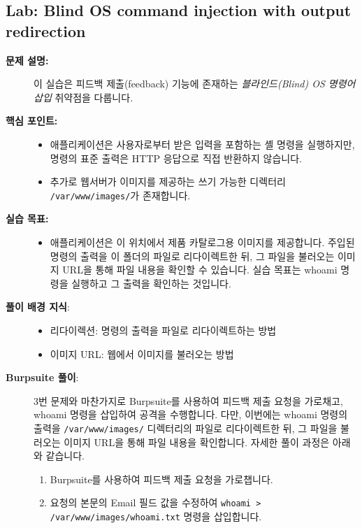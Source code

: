 \documentclass{article}
\begin{document}
\subsection*{Lab: Blind OS command injection with output redirection}
\begin{description}
  \item[\textbf{문제 설명:}] 이 실습은 피드백 제출(feedback) 기능에 존재하는 \emph{블라인드(Blind) OS 명령어 삽입} 취약점을 다룹니다.  
  \item[\textbf{핵심 포인트:}]\leavevmode\par
    \begin{itemize}
      \item 애플리케이션은 사용자로부터 받은 입력을 포함하는 셸 명령을 실행하지만, 명령의 표준 출력은 HTTP 응답으로 직접 반환하지 않습니다.  
      \item 추가로 웹서버가 이미지를 제공하는 쓰기 가능한 디렉터리 \texttt{/var/www/images/}가 존재합니다.
    \end{itemize}

  \item[\textbf{실습 목표:}]\leavevmode\par
    \begin{itemize}
      \item 애플리케이션은 이 위치에서 제품 카탈로그용 이미지를 제공합니다. 
      주입된 명령의 출력을 이 폴더의 파일로 리다이렉트한 뒤, 그 파일을 불러오는 이미지 URL을 통해 파일 내용을 확인할 수 있습니다.
      실습 목표는 whoami 명령을 실행하고 그 출력을 확인하는 것입니다.
    \end{itemize}

  \item[\textbf{풀이 배경 지식}:]\leavevmode\par
    \begin{itemize}
      \item 리다이렉션: 명령의 출력을 파일로 리다이렉트하는 방법
      \item 이미지 URL: 웹에서 이미지를 불러오는 방법
    \end{itemize}

  \item[\textbf{Burpsuite 풀이}:] \leavevmode\par
    3번 문제와 마찬가지로 Burpsuite를 사용하여 피드백 제출 요청을 가로채고, whoami 명령을 삽입하여 공격을 수행합니다.
    다만, 이번에는 whoami 명령의 출력을 \texttt{/var/www/images/} 디렉터리의 파일로 리다이렉트한 뒤, 
    그 파일을 불러오는 이미지 URL을 통해 파일 내용을 확인합니다.
    자세한 풀이 과정은 아래와 같습니다.
  \begin{enumerate}
    \item Burpsuite를 사용하여 피드백 제출 요청을 가로챕니다.
    \item 요청의 본문의 Email 필드 값을 수정하여 \texttt{whoami > /var/www/images/whoami.txt} 명령을 삽입합니다.
    

\end{enumerate}
\end{description}
\end{document}
